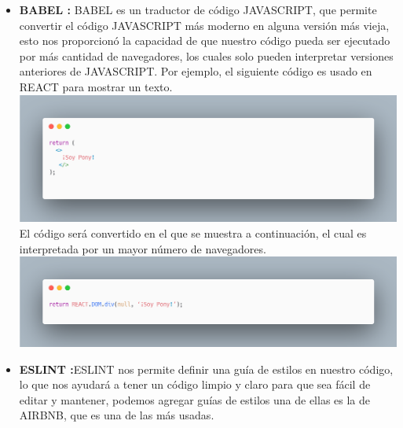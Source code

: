 \begin{itemize}
   \item \textbf{BABEL  :}   BABEL es un traductor de código JAVASCRIPT, que permite convertir el código JAVASCRIPT más moderno en alguna versión más vieja, esto nos proporcionó la capacidad de que nuestro código pueda ser ejecutado por más cantidad de navegadores, los cuales solo pueden interpretar versiones anteriores de JAVASCRIPT. Por ejemplo, el siguiente código es usado en REACT para mostrar un texto. 
   \newline
   \newline
   \includegraphics[width=1\textwidth]{./Imagenes/image16.png}
   \newline
   \newline
   El código será convertido en el que se muestra a continuación, el cual es interpretada por un mayor número de navegadores. 
   \newline
   \newline
   \includegraphics[width=1\textwidth]{./Imagenes/image5.png}
   \newline
   \newline
   \item \textbf{ESLINT :}ESLINT nos permite definir una guía de estilos en nuestro código, lo que nos ayudará a tener un código limpio y claro para que sea fácil de editar y mantener, podemos agregar guías de estilos una de ellas es la de AIRBNB, que es una de las más usadas. 
   
\end{itemize}